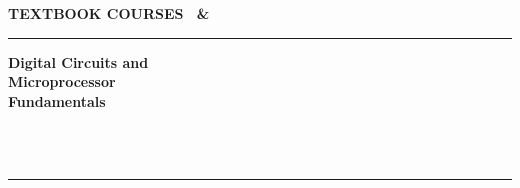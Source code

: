 \thispagestyle{empty}
\begin{titlepage}
\centering
\vspace*{2mm}
{\sffamily\color{kmutnborange}\bfseries\Large TEXTBOOK \quad\textbar\quad COURSES \CourseCode\ \&\ \CourseCodeB}\\[3mm]
{\color{kmutnborange}\rule{0.55\textwidth}{1.6pt}}

\vspace{12mm}
{\sffamily\bfseries\fontsize{38}{42}\selectfont\color{ink} Digital Circuits and\\[2mm] Microprocessor\\[2mm] Fundamentals\par}
\vspace{8mm}
{\sffamily\large\color{accent} \BookSubtitle\par}

\vspace{9mm}


\vfill
{\sffamily\bfseries\LARGE\color{ink} \AuthorFull\par}
\vspace{3mm}
{\sffamily\large \AuthorDept\\ \AuthorFaculty\\ \AuthorUni\par}
\vspace{10mm}
{\color{greyline}\rule{0.3\textwidth}{0.6pt}}\\[2mm]
{\sffamily\small \Edition\quad\textbullet\quad\PubYear}
\restoregeometry
\end{titlepage}

